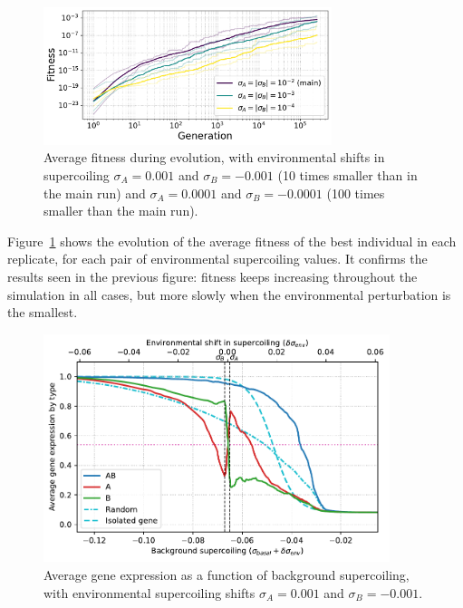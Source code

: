 \begin{figure}
\centering
\includegraphics[width=0.75\textwidth]{param/sigma/fitness_all_with_main.pdf}
\caption[Average fitness during evolution, with decreasing environmental supercoiling shifts]{Average fitness during evolution, with environmental shifts in supercoiling $\sigma_A = 0.001$ and $\sigma_B = -0.001$ (10 times smaller than in the main run) and $\sigma_A = 0.0001$ and $\sigma_B = -0.0001$ (100 times smaller than the main run).}
\label{fig:param:sigma-fitness}
\end{figure}

Figure~\ref{fig:param:sigma-fitness} shows the evolution of the average fitness of the best individual in each replicate, for each pair of environmental supercoiling values.
It confirms the results seen in the previous figure: fitness keeps increasing throughout the simulation in all cases, but more slowly when the environmental perturbation is the smallest.

\begin{figure}
\centering
\includegraphics[width=0.9\textwidth]{param/sigma/sigma-1e-3/activity_sigmas_avg.pdf}
\caption[Average gene expression as a function of background supercoiling, with an absolute environmental supercoiling shift of 0.001]{Average gene expression as a function of background supercoiling, with environmental supercoiling shifts $\sigma_A = 0.001$ and $\sigma_B = -0.001$.}
\label{fig:param:sigma-1e-3-activ-by-sigma}
\end{figure}

